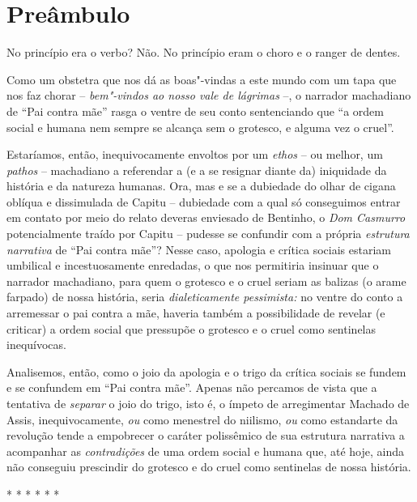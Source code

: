 \section{Preâmbulo}

No princípio era o verbo? Não. No princípio eram o choro e o ranger de
dentes.

Como um obstetra que nos dá as boas"-vindas a este mundo com um tapa que
nos faz chorar -- \emph{bem"-vindos ao nosso vale de lágrimas} --, o
narrador machadiano de ``Pai contra mãe'' rasga o ventre de seu conto
sentenciando que ``a ordem social e humana nem sempre se alcança sem o
grotesco, e alguma vez o cruel''.

Estaríamos, então, inequivocamente envoltos por um \emph{ethos} -- ou
melhor, um \emph{pathos} -- machadiano a referendar a (e a se resignar
diante da) iniquidade da história e da natureza humanas. Ora, mas e se a
dubiedade do olhar de cigana oblíqua e dissimulada de Capitu --
dubiedade com a qual só conseguimos entrar em contato por meio do relato
deveras enviesado de Bentinho, o \emph{Dom Casmurro} potencialmente
traído por Capitu -- pudesse se confundir com a própria \emph{estrutura
narrativa} de ``Pai contra mãe''? Nesse caso, apologia e crítica sociais
estariam umbilical e incestuosamente enredadas, o que nos permitiria
insinuar que o narrador machadiano, para quem o grotesco e o cruel
seriam as balizas (o arame farpado) de nossa história, seria
\emph{dialeticamente pessimista:} no ventre do conto a arremessar o pai
contra a mãe, haveria também a possibilidade de revelar (e criticar) a
ordem social que pressupõe o grotesco e o cruel como sentinelas
inequívocas.

Analisemos, então, como o joio da apologia e o trigo da crítica sociais
se fundem e se confundem em ``Pai contra mãe''. Apenas não percamos de
vista que a tentativa de \emph{separar} o joio do trigo, isto é, o
ímpeto de arregimentar Machado de Assis, inequivocamente, \emph{ou} como
menestrel do niilismo, \emph{ou} como estandarte da revolução tende a
empobrecer o caráter polissêmico de sua estrutura narrativa a acompanhar
as \emph{contradições} de uma ordem social e humana que, até hoje, ainda
não conseguiu prescindir do grotesco e do cruel como sentinelas de nossa
história.

\begin{center}* * * * * *\end{center}

